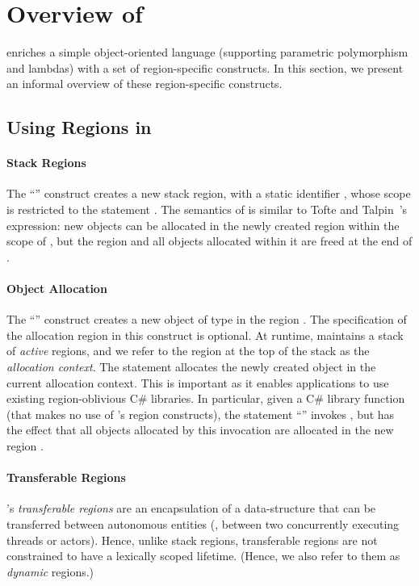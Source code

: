 \newcommand{\COMMENT}[1]{}

\section{Overview of \name}
\label{sec:overview}

\name enriches a simple object-oriented language (supporting
parametric polymorphism and lambdas) with a set of region-specific constructs. 
In this section, we present an informal overview of these region-specific constructs.

\subsection{Using Regions in \name}

\paragraph{Stack Regions}
The ``'' construct creates a new stack region,
with a static identifier , whose scope is restricted to the
statement . The semantics of   is similar
to Tofte and Talpin~\cite{tofte94}'s  expression:
new objects can be allocated in the newly created region within
the scope of , but the region and all objects allocated within it
are freed at the end of .

\paragraph{Object Allocation}
The ``'' construct creates a new object of type  in
the region . The specification of the allocation region  in
this construct is optional.  At runtime, \name maintains a stack of \emph{active}
regions, and we refer to the region at the top of the stack as the \emph{allocation
context}. The statement  allocates the newly created object in
the current allocation context.
%
This is important as it enables \name applications to use existing region-oblivious
C\# libraries. In particular, given a  C\# library function  (that makes no use of
\name's region constructs), the statement ``'' invokes ,
but has the effect that all objects allocated by this invocation are allocated in the
new region .

\paragraph{Transferable Regions}
\name's \emph{transferable regions} are an encapsulation of a data-structure
that can be transferred between autonomous entities
(\eg, between two concurrently executing threads or actors).
Hence, unlike stack regions, transferable regions are not constrained to have a
lexically scoped lifetime.
(Hence, we also refer to them as \emph{dynamic} regions.)

